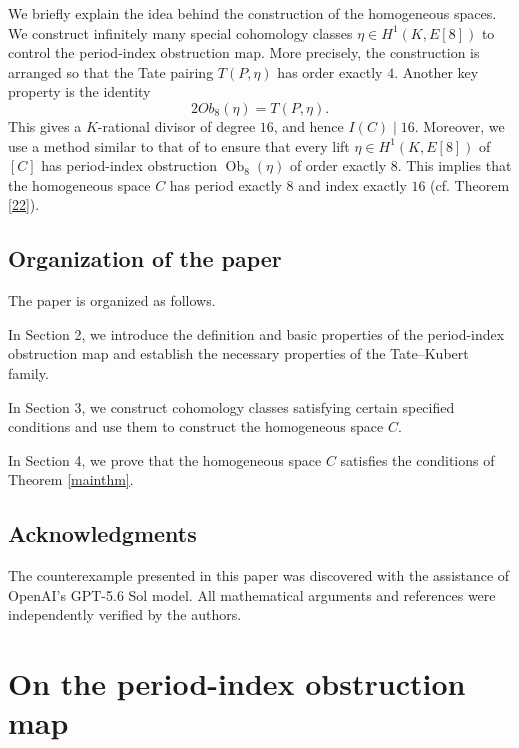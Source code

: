 \documentclass[11pt,a4paper]{amsart}
\theoremstyle{definition}
\numberwithin{equation}{section}
\begin{document}
We briefly explain the idea behind the construction of the homogeneous spaces. We construct infinitely many special cohomology classes
$
\eta\in H^1(K,E[8])
$
to control the period-index obstruction map. More precisely, the construction is arranged so that the Tate pairing \(T(P,\eta)\) has order exactly \(4\). Another key property is the identity
\begin{equation*}
2Ob_8(\eta)=T(P,\eta).
\end{equation*}
This gives a \(K\)-rational divisor of degree \(16\), and hence $I(C)\mid16$. Moreover, we use a method similar to that of   \cite{ClarkSharif} to ensure that every lift \(\eta\in H^1(K,E[8])\) of \([C]\) has period-index obstruction \(\operatorname{Ob}_8(\eta)\) of order exactly \(8\). This implies that the homogeneous space \(C\) has period exactly \(8\) and index exactly \(16\) (cf. Theorem \ref{22}).

\subsection{Organization of the paper}
The paper is organized as follows.

In Section 2, we introduce the definition and basic properties of the
period-index obstruction map and establish the necessary properties of
the Tate--Kubert family.

In Section 3, we construct cohomology classes satisfying certain
specified conditions and use them to construct the homogeneous space
\(C\).

In Section 4, we prove that the homogeneous space \(C\) satisfies the
conditions of Theorem \ref{mainthm}.

\subsection{Acknowledgments}
The counterexample presented in this paper was discovered with the assistance of OpenAI's
GPT-5.6 Sol model. All mathematical arguments and references were independently
verified by the authors.

\section{On the period-index obstruction map}
\end{document}
